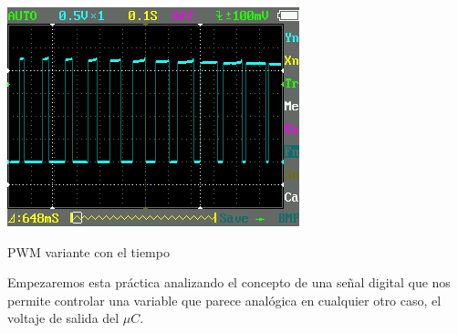 		\begin{marginfigure}
			\begin{center}
				\includegraphics[width=\textwidth]{images/PWM_fade.png}
				\caption{PWM variante con el tiempo}
				\label{fig:PWM_fade}
			\end{center}
		\end{marginfigure}

		Empezaremos esta práctica analizando el concepto de una señal digital que nos permite controlar una variable que parece analógica en cualquier otro caso, el voltaje de salida del $\mu C$.

